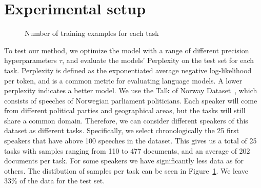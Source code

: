 \documentclass[fullpaper]{nldl}
\begin{document}
\section{Experimental setup} \label{sec:experimental_setup}
\begin{figure} 
    
    \centering
    \caption{Number of training examples for each task}
    \label{fig:task_len}
\end{figure}
To test our method, we optimize the model with a range of different precision hyperparameters $\tau$, and evaluate the models' Perplexity on the test set for each task.
Perplexity is defined as the exponentiated average negative log-likelihood per token, and is a common metric for evaluating language models. A lower perplexity indicates a better model.
We use the Talk of Norway Dataset~\cite{lapponi_talk_2018}, which consists of speeches of Norwegian parliament politicians.
Each speaker will come from different political parties and geographical areas, but the tasks will still share a common domain. 
Therefore, we can consider different speakers of this dataset as different tasks. Specifically, we select chronologically the 25 first speakers that have above 100 speeches in the dataset.
This gives us a total of 25 tasks with samples ranging from 110 to 477 documents, and an average of 202 documents per task. For some speakers we have significantly less data as for others. 
The distibution of samples per task can be seen in Figure~\ref{fig:task_len}.
We leave 33\% of the data for the test set.
\end{document}
